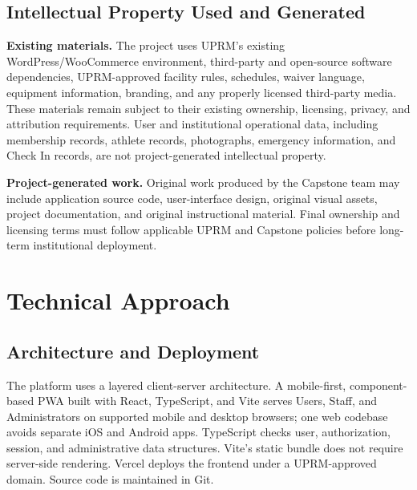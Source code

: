 \documentclass[11pt,letterpaper]{article}
\begin{document}
\subsection{Intellectual Property Used and Generated}

\textbf{Existing materials.} The project uses UPRM's existing WordPress/WooCommerce environment, third-party and open-source software dependencies, UPRM-approved facility rules, schedules, waiver language, equipment information, branding, and any properly licensed third-party media. These materials remain subject to their existing ownership, licensing, privacy, and attribution requirements. User and institutional operational data, including membership records, athlete records, photographs, emergency information, and Check In records, are not project-generated intellectual property.

\textbf{Project-generated work.} Original work produced by the Capstone team may include application source code, user-interface design, original visual assets, project documentation, and original instructional material. Final ownership and licensing terms must follow applicable UPRM and Capstone policies before long-term institutional deployment.



\section{Technical Approach}

\subsection{Architecture and Deployment}

The platform uses a layered client-server architecture. A mobile-first, component-based PWA built with React, TypeScript, and Vite serves Users, Staff, and Administrators on supported mobile and desktop browsers; one web codebase avoids separate iOS and Android apps. TypeScript checks user, authorization, session, and administrative data structures. Vite's static bundle does not require server-side rendering. Vercel deploys the frontend under a UPRM-approved domain. Source code is maintained in Git.
\end{document}
